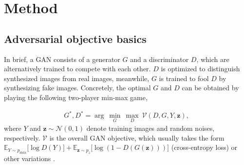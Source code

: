 \documentclass[10pt,twocolumn,letterpaper]{article}
\begin{document}
\section{Method}

\subsection{Adversarial objective basics}
In brief, a GAN \cite{goodfellow2014generative} consists of a generator $G$ and a discriminator $D$, which are alternatively trained to compete with each other. $D$ is optimized to distinguish synthesized images from real images, meanwhile, $G$ is trained to fool $D$ by synthesizing fake images. Concretely, the optimal $G$ and $D$ can be obtained by playing the following two-player min-max game,

\begin{equation}
\label{equ:GAN}
\begin{split}
G^*, D^* = \arg~\underset{G}{\min}\ \underset{D}{\max}~ \mathcal{V}(D, G, Y, \bm z),
\end{split}
\end{equation}
where $Y$ and $\bm z \sim \mathcal{N}(0,1)$ denote training images and random noises, respectively. 
$\mathcal{V}$ is the overall GAN objective, which usually takes the form $\mathbb{E}_{Y\sim p_{data}}\big[\log D(Y)\big] + \mathbb{E}_{\bm z\sim p_{z}}\big[\log (1-D(G(\bm z)))\big]$ (cross-entropy loss) or other variations \cite{lsgan,berthelot2017began}.

\end{document}
